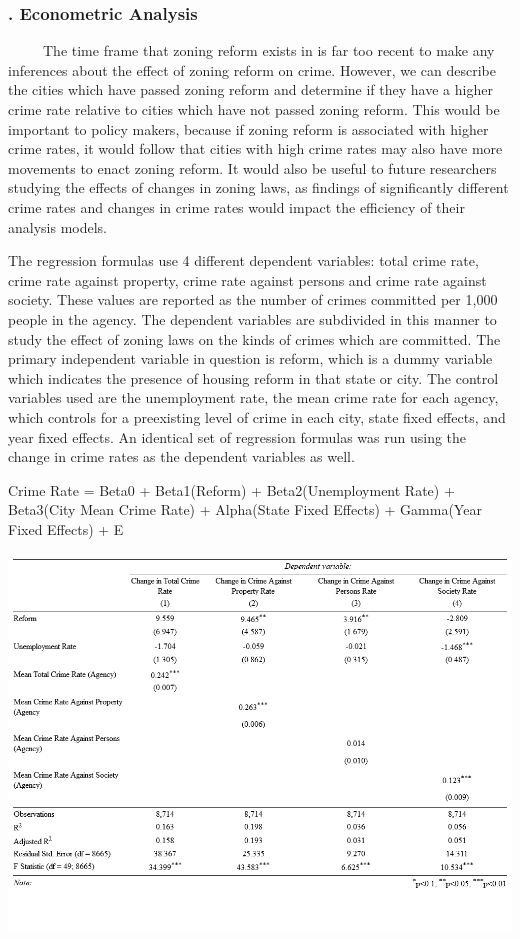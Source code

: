 \documentclass[
  12pt,
]{article}
\begin{document}
\hypertarget{econometric-analysis}{%
\subsubsection{. Econometric Analysis}\label{econometric-analysis}}

\setlength\parindent{24pt}

~~~~~The time frame that zoning reform exists in is far too recent to
make any inferences about the effect of zoning reform on crime. However,
we can describe the cities which have passed zoning reform and determine
if they have a higher crime rate relative to cities which have not
passed zoning reform. This would be important to policy makers, because
if zoning reform is associated with higher crime rates, it would follow
that cities with high crime rates may also have more movements to enact
zoning reform. It would also be useful to future researchers studying
the effects of changes in zoning laws, as findings of significantly
different crime rates and changes in crime rates would impact the
efficiency of their analysis models.

The regression formulas use 4 different dependent variables: total crime
rate, crime rate against property, crime rate against persons and crime
rate against society. These values are reported as the number of crimes
committed per 1,000 people in the agency. The dependent variables are
subdivided in this manner to study the effect of zoning laws on the
kinds of crimes which are committed. The primary independent variable in
question is reform, which is a dummy variable which indicates the
presence of housing reform in that state or city. The control variables
used are the unemployment rate, the mean crime rate for each agency,
which controls for a preexisting level of crime in each city, state
fixed effects, and year fixed effects. An identical set of regression
formulas was run using the change in crime rates as the dependent
variables as well.

Crime Rate = Beta0 + Beta1(Reform) + Beta2(Unemployment Rate) +
Beta3(City Mean Crime Rate) + Alpha(State Fixed Effects) + Gamma(Year
Fixed Effects) + E

\includegraphics{Data/Regression Outputs/pngs/finalchangeregv2.png}
\end{document}
